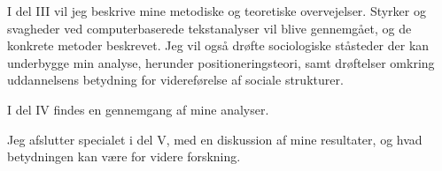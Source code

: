 I del III vil jeg beskrive mine metodiske og teoretiske overvejelser.
Styrker og svagheder ved computerbaserede tekstanalyser vil blive gennemgået, og de konkrete metoder beskrevet.
Jeg vil også drøfte sociologiske ståsteder der kan underbygge min analyse, herunder positioneringsteori, samt drøftelser omkring uddannelsens betydning for videreførelse af sociale strukturer.

I del IV findes en gennemgang af mine analyser.

Jeg afslutter specialet i del V, med en diskussion af mine resultater, og hvad betydningen kan være for videre forskning.
